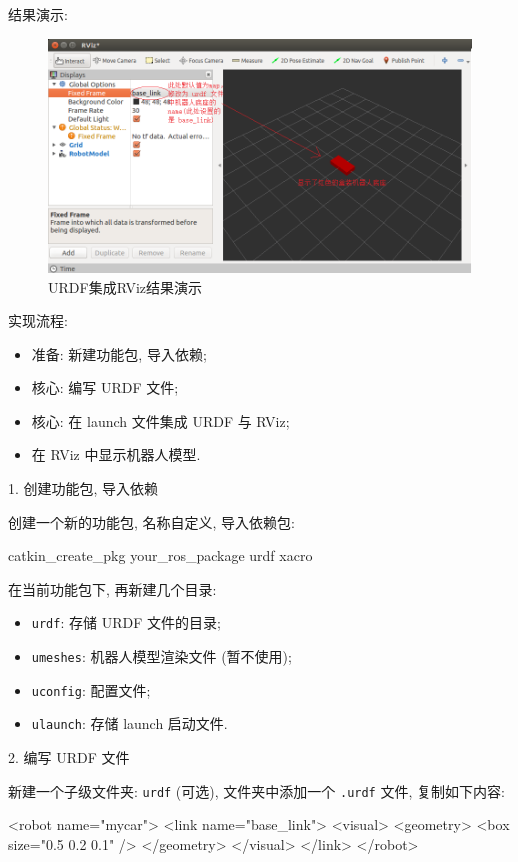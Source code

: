 \documentclass[openany, fontset=windowsold]{ctexbook}
\theoremstyle{kaiti}
\theoremstyle{normal}
\begin{document}
结果演示:

\begin{figure}[!ht]
  \centering
  \includegraphics[width=.9\textwidth]{ros_sim_urdf_rviz.png}
  \caption{URDF集成RViz结果演示}
  \label{fig:ros_sim_urdf_rviz}
\end{figure}

实现流程: 

\begin{itemize}
  \item 准备: 新建功能包, 导入依赖;
  \item 核心: 编写 URDF 文件;
  \item 核心: 在 launch 文件集成 URDF 与 RViz;
  \item 在 RViz 中显示机器人模型.
\end{itemize}

1. 创建功能包, 导入依赖

创建一个新的功能包, 名称自定义, 导入依赖包:

\begin{bash}
  catkin_create_pkg your_ros_package urdf xacro
\end{bash}

在当前功能包下, 再新建几个目录:

\begin{itemize}
  \item \verb|urdf|: 存储 URDF 文件的目录;
  \item \verb|umeshes|: 机器人模型渲染文件 (暂不使用);
  \item \verb|uconfig|: 配置文件;
  \item \verb|ulaunch|: 存储 launch 启动文件.
\end{itemize}

2. 编写 URDF 文件

新建一个子级文件夹: \verb|urdf| (可选), 文件夹中添加一个 \verb|.urdf| 文件, 复制如下内容:

\begin{xml}
  <robot name="mycar">
      <link name="base_link">
          <visual>
              <geometry>
                  <box size="0.5 0.2 0.1" />
              </geometry>
          </visual>
      </link>
  </robot>
\end{xml}
\end{document}
